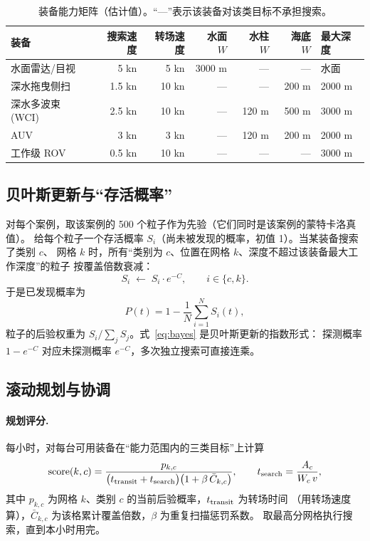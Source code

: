 \begin{table}[H]
\centering\small
\caption{装备能力矩阵（估计值）。“—”表示该装备对该类目标不承担搜索。}
\label{tab:cap}
\begin{tabular}{@{}lrrrrrl@{}}
\toprule
装备 & 搜索速度 & 转场速度 & 水面 $W$ & 水柱 $W$ & 海底 $W$ & 最大深度\\
\midrule
水面雷达/目视 & 5 kn & 5 kn & 3000 m & — & — & 水面\\
深水拖曳侧扫 & 1.5 kn & 10 kn & — & — & 200 m & 2000 m\\
深水多波束 (WCI) & 2.5 kn & 10 kn & — & 120 m & 500 m & 3000 m\\
AUV & 3 kn & 3 kn & — & 120 m & 200 m & 2000 m\\
工作级 ROV & 0.5 kn & 10 kn & — & — & — & 3000 m\\
\bottomrule
\end{tabular}
\end{table}

\subsection{贝叶斯更新与“存活概率”}

对每个案例，取该案例的 500 个粒子作为先验（它们同时是该案例的蒙特卡洛真值）。
给每个粒子一个存活概率 $S_i$（尚未被发现的概率，初值 1）。当某装备搜索了类别 $c$、
网格 $k$ 时，所有“类别为 $c$、位置在网格 $k$、深度不超过该装备最大工作深度”的粒子
按覆盖倍数衰减：
\begin{equation}
  S_i \;\leftarrow\; S_i \cdot e^{-C}, \qquad i\in\{c,k\}.
  \label{eq:bayes}
\end{equation}
于是已发现概率为
\begin{equation}
  P(t)=1-\frac{1}{N}\sum_{i=1}^{N}S_i(t),
\end{equation}
粒子的后验权重为 $S_i/\sum_j S_j$。式~\eqref{eq:bayes} 是贝叶斯更新的指数形式：
探测概率 $1-e^{-C}$ 对应未探测概率 $e^{-C}$，多次独立搜索可直接连乘。

\subsection{滚动规划与协调}

\paragraph{规划评分.} 每小时，对每台可用装备在“能力范围内的三类目标”上计算
\begin{equation}
  \mathrm{score}(k,c)=\frac{p_{k,c}}{\bigl(t_{\rm transit}+t_{\rm search}\bigr)
  \bigl(1+\beta\,\bar C_{k,c}\bigr)},
  \qquad t_{\rm search}=\frac{A_c}{W_c\,v},
  \label{eq:score}
\end{equation}
其中 $p_{k,c}$ 为网格 $k$、类别 $c$ 的当前后验概率，$t_{\rm transit}$ 为转场时间
（用转场速度算），$\bar C_{k,c}$ 为该格累计覆盖倍数，$\beta$ 为重复扫描惩罚系数。
取最高分网格执行搜索，直到本小时用完。

